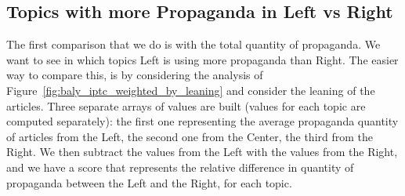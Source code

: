 
\subsection{\statusgreen Topics with more Propaganda in Left vs Right}
\label{ssec:topic_propaganda_leaning_tot_quantity}


The first comparison that we do is with the total quantity of propaganda. We want to see in which topics Left is using more propaganda than Right.
The easier way to compare this, is by considering the analysis of Figure~\ref{fig:baly_iptc_weighted_by_leaning} and consider the leaning of the articles. Three separate arrays of values are built (values for each topic are computed separately):
the first one representing the average propaganda quantity of articles from the Left, the second one from the Center, the third from the Right.
We then subtract the values from the Left with the values from the Right, and we have a score that represents
the relative difference in quantity of propaganda between the Left and the Right, for each topic.



